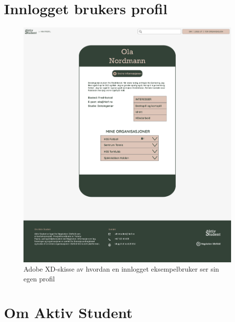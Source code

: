 \section{Innlogget brukers profil}

\begin{figure}[H]
\centering
\includegraphics[width=\textwidth]{Illustrasjoner/Skisser-pdf/3.0/3-10-min-profil.pdf}
\caption{Adobe XD-skisse av hvordan en innlogget eksempelbruker ser sin egen profil}
\label{vedlegg:3-10-min-profil}
\end{figure}

\section{Om Aktiv Student}


